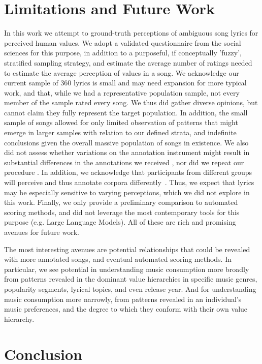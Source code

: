 \documentclass{article}
\begin{document}
\section{Limitations and Future Work} 
In this work we attempt to ground-truth perceptions of ambiguous song lyrics for perceived human values. We adopt a validated questionnaire from the social sciences for this purpose, in addition to a purposeful, if conceptually 'fuzzy', stratified sampling strategy, and estimate the average number of ratings needed to estimate the average perception of values in a song. We acknowledge our current sample of 360 lyrics is small and may need expansion for more typical work, and that, while we had a representative population sample, not every member of the sample rated every song. We thus did gather diverse opinions, but cannot claim they fully represent the target population. In addition, the small sample of songs allowed for only limited observation of patterns that might emerge in larger samples with relation to our defined strata, and indefinite conclusions given the overall massive population of songs in existence. We also did not assess whether variations on the annotation instrument might result in substantial differences in the annotations we received \cite{kern2023annotation}, nor did we repeat our procedure \cite{inel2023collect}. In addition, we acknowledge that participants from different groups will perceive and thus annotate corpora differently~\cite{homan2022annotator, prabhakaran2023framework}. Thus, we expect that lyrics may be especially sensitive to varying perceptions, which we did not explore in this work. Finally, we only provide a preliminary comparison to automated scoring methods, and did not leverage the most contemporary tools for this purpose (e.g. Large Language Models). All of these are rich and promising avenues for future work.  

The most interesting avenues are potential relationships that could be revealed with more annotated songs, and eventual automated scoring methods. In particular, we see potential in understanding music consumption more broadly from patterns revealed in the dominant value hierarchies in specific music genres, popularity segments, lyrical topics, and even release year. And for understanding music consumption more narrowly, from patterns revealed in an individual's music preferences, and the degree to which they conform with their own value hierarchy. 

\section{Conclusion}
\end{document}
